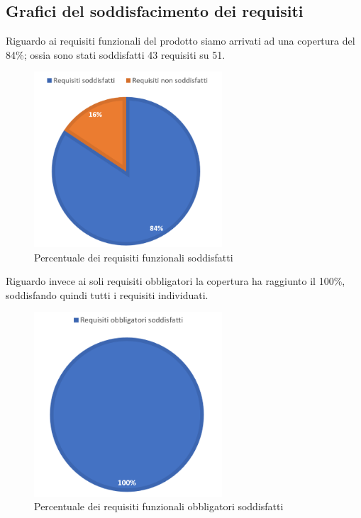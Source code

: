 \subsection{Grafici del soddisfacimento dei requisiti}
Riguardo ai requisiti funzionali del prodotto siamo arrivati ad una copertura del 84\%; ossia sono stati soddisfatti 43 requisiti su 51.
\begin{figure}[hb]
\includegraphics[width=7cm]{Images/RequisitiTotali}
\centering
\caption{Percentuale dei requisiti funzionali soddisfatti}
\end{figure}

Riguardo invece ai soli requisiti obbligatori la copertura ha raggiunto il 100\%, soddisfando quindi tutti i requisiti individuati.
\begin{figure}[hb]
\includegraphics[width=7cm]{Images/RequisitiObbligatori}
\centering
\caption{Percentuale dei requisiti funzionali obbligatori soddisfatti}
\end{figure}